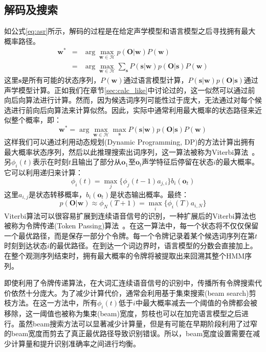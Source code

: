 \subsection{解码及搜索}
\label{sec:decode}
如公式\ref{eq:asr}所示，解码的过程是在给定声学模型和语言模型之后寻找拥有最大概率路径。
\begin{eqnarray}
\mathbf{w}^* &=& \arg \max_{\mathbf{w} \in \mathcal{H}}p(\mathbf{O}|\mathbf{w})P(\mathbf{w}) \\
&=& \arg \max_{\mathbf{w} \in \mathcal{H}} \sum_{\mathbf{s}} P(\mathbf{s}|\mathbf{w})p(\mathbf{O}|\mathbf{s})P(\mathbf{w})
\end{eqnarray}
这里$\mathbf{s}$是所有可能的状态序列，$P(\mathbf{w})$通过语言模型计算，$P(\mathbf{s}|\mathbf{w})p(\mathbf{O}|\mathbf{s})$通过声学模型计算。正如我们在章节\ref{sec:calc_like}中讨论过的，这一似然可以通过前向后向算法进行计算。然而，因为候选词序列可能性过于庞大，无法通过对每个候选进行前向后向算法来计算似然。因此，实际中通常利用最大概率的状态路径来近似整个概率，即：
\begin{equation}
\label{eq:decode}
\mathbf{w}^* = \arg \max_{\mathbf{w} \in \mathcal{H}} \max_{\mathbf{s}} P(\mathbf{s}|\mathbf{w})p(\mathbf{O}|\mathbf{s})P(\mathbf{w})
\end{equation}
这样我们可以通过利用动态规划(Dynamic Programming, DP)的方法计算出拥有最大概率状态序列，然后以此推理搜索出词序列，这一算法被称为Viterbi算法~\cite{viterbi1967error}。另$\phi_i(t)$表示在时刻$t$且输出了部分从$\mathbf{o}_1$至$\mathbf{o}_t$声学特征后停留在状态$i$的最大概率。它可以利用递归来计算：
\begin{equation}
    \phi_i(t)=\max_j\{\phi_j(t-1)a_{j,i}\}b_i(\mathbf{o}_t)
\end{equation}
这里$a_{i,j}$是状态转移概率，$b_i(\mathbf{o}_t)$是状态输出概率。最终：
\begin{equation}
    p(\mathbf{O}|\mathbf{w}) \approx \phi_{N}(T+1) = \max_i\{\phi_i(T)a_{i,N}\}
\end{equation}
Viterbi算法可以很容易扩展到连续语音信号的识别，一种扩展后的Viterbi算法也被称为令牌传递(Token Passing)算法~\cite{young2002htk}。在这一算法中，每一个状态将不仅仅保留一个最优路径，而是保存一部分个令牌。每一个令牌记录着某个候选词序列在第$t$时刻到达状态$i$的最优路径。在到达一个词边界时，语言模型的分数会直接加上。在整个观测序列结束时，拥有最大概率的令牌将被提取出来回溯其整个HMM序列。

即使利用了令牌传递算法，在大词汇连续语音信号的识别中，传播所有令牌搜索代价依然十分庞大。为了减少计算代价，通常会利用基于集束搜索(beam search)剪枝方法。在这一方法中，所有$\phi_i(t)$低于$i$中最大概率减去一个阈值的令牌都会被移除，这一阈值也被称为集束(beam)宽度，剪枝也可以在加完语言模型之后进行。虽然beam搜索方法可以显著减少计算量，但是有可能在早期阶段利用了过窄的beam宽度而剪去了真正最优路径导致识别错误。所以，beam宽度设置需要在减少计算量和提升识别准确率之间进行均衡。

